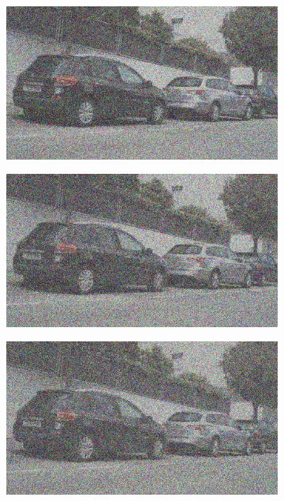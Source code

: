 \documentclass[a4paper]{ctexart}
\begin{document}
\begin{figure}[htbp]
\begin{subfigure}{0.08\textwidth}
				\label{fig：Gamma=0.7, Gauss Noise = 0.7}
			\end{subfigure}
			\begin{subfigure}{0.08\textwidth}
				\captionsetup{font=scriptsize}
				\includegraphics[width=\linewidth]{picture/Edge Detection/degrade/RGB_001 Gamma=0.7, Gauss Noise=0.8}
				\label{fig：Gamma=0.7, Gauss Noise = 0.8}
			\end{subfigure}
			\begin{subfigure}{0.08\textwidth}
				\captionsetup{font=scriptsize}
				\includegraphics[width=\linewidth]{picture/Edge Detection/degrade/RGB_001 Gamma=0.7, Gauss Noise=0.9}
				\label{fig：Gamma=0.7, Gauss Noise = 0.9}
			\end{subfigure}
			\begin{subfigure}{0.08\textwidth}
				\captionsetup{font=scriptsize}
				\includegraphics[width=\linewidth]{picture/Edge Detection/degrade/RGB_001 Gamma=0.7, Gauss Noise=1.0}

\end{subfigure}
\end{figure}
\end{document}
